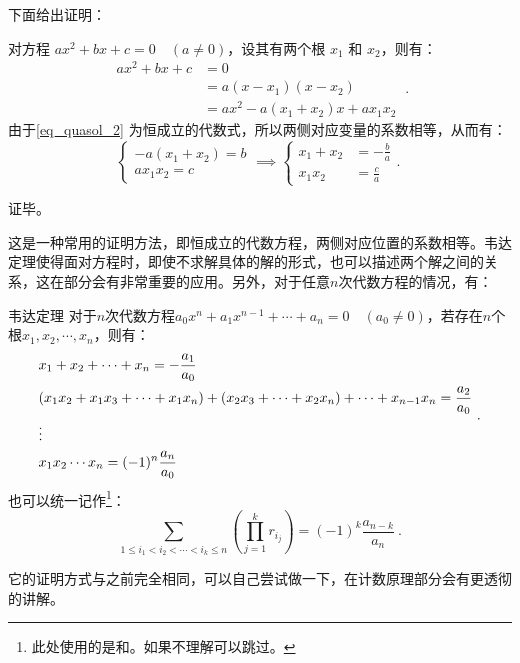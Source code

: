 下面给出证明：

对方程 $a x^2 + b x + c = 0\quad(a \neq 0)$，设其有两个根 $x_1$ 和 $x_2$，则有：
\begin{equation}\label{eq_quasol_2}
\begin{split}
ax^2+bx+c &= 0 \\ 
&=a(x-x_1)(x-x_2)\\
&=ax^2-a(x_1+x_2)x+ax_1x_2
\end{split}~.
\end{equation}
由于\autoref{eq_quasol_2} 为恒成立的代数式，所以两侧对应变量的系数相等，从而有：
\begin{equation}
\begin{cases}
-a(x_1+x_2)=b\\
ax_1x_2=c
\end{cases}
\implies
\begin{cases}
x_1 + x_2 &= \displaystyle-\frac{b}{a} \\
x_1 x_2 &= \displaystyle\frac{c}{a}
\end{cases}.~
\end{equation}

证毕。

这是一种常用的证明方法，即恒成立的代数方程，两侧对应位置的系数相等。韦达定理使得面对方程时，即使不求解具体的解的形式，也可以描述两个解之间的关系，这在部分会有非常重要的应用。另外，对于任意$n$次代数方程的情况，有：
\begin{theorem}{韦达定理}
对于$n$次代数方程$a_0x^n+a_1x^{n-1}+\cdots+a_n=0\quad(a_0\neq0)$，若存在$n$个根$x_1,x_2,\cdots,x_n$，则有：
\begin{equation}
\begin{split}
&x_1+x_2+\cdots +x_n=-{a_1\over a_0}\\
&(x_1x_2+x_1x_3+\cdots+ x_1x_n)+(x_2x_3+\cdots +x_2x_n)+\cdots+x_{n-1}x_n={a_2\over a_0}\\
&\vdots\\
&x_1x_2\cdots x_n=(-1)^n{a_n\over a_0}
\end{split}~.
\end{equation}
也可以统一记作\footnote{此处使用的是和。如果不理解可以跳过。}：
\begin{equation}
\sum_{1\le i_1 < i_2 < \cdots < i_k\le n} \left(\prod_{j = 1}^k r_{i_j}\right)=(-1)^k\frac{a_{n-k}}{a_n}~.
\end{equation}
\end{theorem}

它的证明方式与之前完全相同，可以自己尝试做一下，在计数原理部分会有更透彻的讲解。
